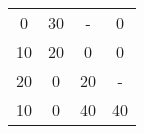 \begin{tabular}{cccc}
\rowcolor[rgb]{ .749,  .749,  .749} 0      & 30     & -      & 0 \\
\rowcolor[rgb]{ .749,  .749,  .749} 10     & 20     & 0      & 0 \\
20     & \cellcolor[rgb]{ .749,  .749,  .749} 0 & \cellcolor[rgb]{ .749,  .749,  .749} 20 & - \\
10     & \cellcolor[rgb]{ .749,  .749,  .749} 0 & \cellcolor[rgb]{ .749,  .749,  .749} 40 & 40 \bigstrut[b]\\
\hline
\hline
\end{tabular}%
